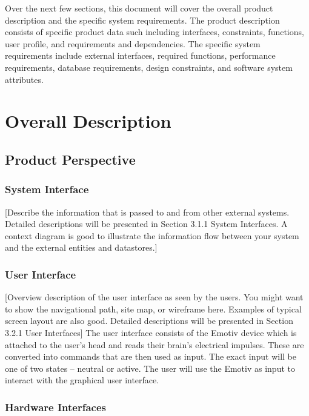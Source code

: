 \documentclass{report}
\begin{document}
Over the next few sections, this document will cover the overall product description and the 
specific system requirements. The product description consists of specific product data such including 
interfaces, constraints, functions, user profile, and requirements and dependencies. The specific system 
requirements include external interfaces, required functions, performance requirements, database 
requirements, design constraints, and software system attributes.

\newpage

\section{Overall Description}

\subsection{Product Perspective}

\subsubsection{System Interface}

[Describe the information that is passed to and from other external systems. Detailed descriptions 
will be presented in Section 3.1.1 System Interfaces. A context diagram is good to illustrate the 
information flow between your system and the external entities and datastores.]

\subsubsection{User Interface}

[Overview description of the user interface as seen by the users. You might want to show the navigational path, site map, or wireframe here. Examples of typical screen layout are also good. Detailed descriptions will be presented in Section 3.2.1 User Interfaces]
	The user interface consists of the Emotiv device which is attached to the user's head and reads their brain's electrical impulses. These are converted into commands that are then used as input. The exact input will be one of two states – neutral or active. The user will use the Emotiv as input to interact with the graphical user interface.

\subsubsection{Hardware Interfaces}
\end{document}
